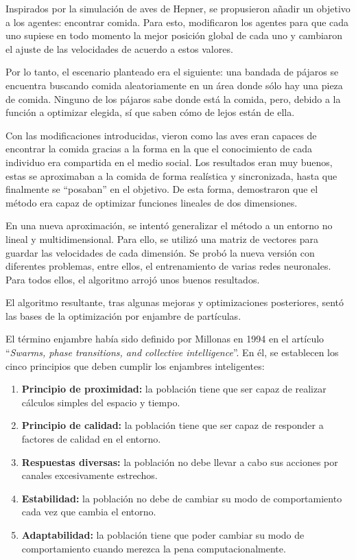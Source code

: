 \documentclass[a4paper,12pt,titlepage]{article}
\begin{document}
Inspirados por la simulación de aves de Hepner, se propusieron añadir un objetivo a los agentes: encontrar comida. Para esto, modificaron los agentes para que cada uno supiese en todo momento la mejor posición global de cada uno y cambiaron el ajuste de las velocidades de acuerdo a estos valores.

Por lo tanto, el escenario planteado era el siguiente: una bandada de pájaros se encuentra buscando comida aleatoriamente en un área donde sólo hay una pieza de comida. Ninguno de los pájaros sabe donde está la comida, pero, debido a la función a optimizar elegida, sí que saben cómo de lejos están de ella.

Con las modificaciones introducidas, vieron como las aves eran capaces de encontrar la comida gracias a la forma en la que el conocimiento de cada individuo era compartida en el medio social. Los resultados eran muy buenos, estas se aproximaban a la comida de forma realística y sincronizada, hasta que finalmente se “posaban” en el objetivo. De esta forma, demostraron que el método era capaz de optimizar funciones lineales de dos dimensiones.

En una nueva aproximación, se intentó generalizar el método a un entorno no lineal y multidimensional. Para ello, se utilizó una matriz de vectores para guardar las velocidades de cada dimensión. Se probó la nueva versión con diferentes problemas, entre ellos, el entrenamiento de varias redes neuronales. Para todos ellos, el algoritmo arrojó unos buenos resultados.

El algoritmo resultante, tras algunas mejoras y optimizaciones posteriores, sentó las bases de la optimización por enjambre de partículas.

El término enjambre había sido definido por Millonas en 1994 en el artículo “\textit{Swarms, phase transitions, and collective intelligence}”\citep{millonas_swarms_1992}. En él, se establecen los cinco principios que deben cumplir los enjambres inteligentes: 

\begin{enumerate}[noitemsep]
	\item \textbf{Principio de proximidad:} la población tiene que ser capaz de realizar cálculos simples del espacio y tiempo.
	\item \textbf{Principio de calidad:} la población tiene que ser capaz de responder a factores de calidad en el entorno.
	\item \textbf{Respuestas diversas:} la población no debe llevar a cabo sus acciones por canales excesivamente estrechos.
	\item \textbf{Estabilidad:} la población no debe de cambiar su modo de comportamiento cada vez que cambia el entorno.
	\item \textbf{Adaptabilidad:} la población tiene que poder cambiar su modo de comportamiento cuando merezca la pena computacionalmente.
\end{enumerate}
\end{document}
